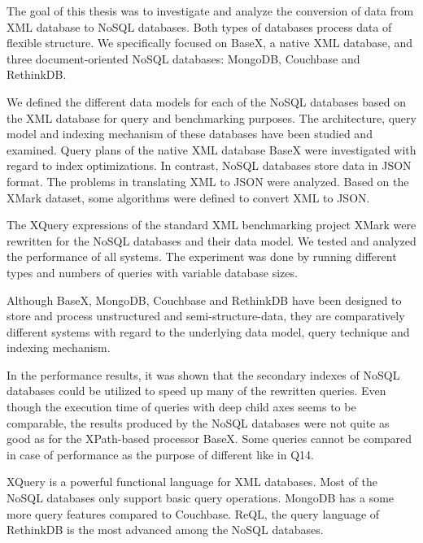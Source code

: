 The goal of this thesis was to investigate and analyze the conversion of data from XML database to NoSQL databases. Both types of databases process data of flexible structure. We specifically focused on BaseX, a native XML database, and three document-oriented NoSQL databases: MongoDB, Couchbase and RethinkDB. 

We defined the different data models for each of the NoSQL databases based on the XML database for query and benchmarking purposes. The architecture, query model and indexing mechanism of these databases have been studied and examined. Query plans of the native XML database BaseX were investigated with regard to index optimizations. In contrast, NoSQL databases store data in JSON format. The problems in translating XML to JSON were analyzed. Based on the XMark dataset, some algorithms were defined to convert XML to JSON.

The XQuery expressions of the standard XML benchmarking project XMark were rewritten for the NoSQL databases and their data model. We tested and analyzed the performance of all systems. The experiment was done by running different types and numbers of queries with variable database sizes.
\par
Although BaseX, MongoDB, Couchbase and RethinkDB have been designed to store and process unstructured and semi-structure-data, they are comparatively different systems with regard to the underlying data model, query technique and indexing mechanism.

In the performance results, it was shown that the secondary indexes of NoSQL databases could be utilized to speed up many of the rewritten queries. Even though the execution time of queries with deep child axes seems to be comparable, the results produced by the NoSQL databases were not quite as good as for the XPath-based processor BaseX. Some queries cannot be compared in case of performance as the purpose of different like in Q14.

XQuery is a powerful functional language for XML databases. Most of the NoSQL databases only support basic query operations. MongoDB has a some more query features compared to Couchbase. ReQL, the query language of RethinkDB is the most advanced among the NoSQL databases.

\par

